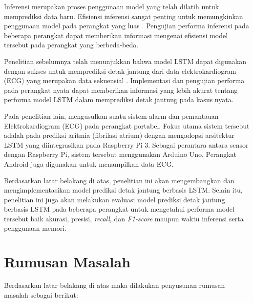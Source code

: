 Inferensi merupakan proses penggunaan model yang telah dilatih untuk memprediksi data baru. 
Efisiensi inferensi sangat penting untuk memungkinkan penggunaan model pada perangkat yang luas \parencite{ulkerReviewingInferencePerformance2020}. 
Pengujian performa inferensi pada beberapa perangkat dapat memberikan informasi mengenai efisiensi model tersebut pada perangkat yang berbeda-beda.

Penelitian sebelumnya telah menunjukkan bahwa model LSTM dapat digunakan dengan sukses untuk memprediksi detak jantung dari data elektrokardiogram (ECG) yang merupakan data sekuensial \parencite{shchetininArrhythmiaDetectionUsing2022}. Implementasi dan pengujian performa pada perangkat nyata dapat memberikan informasi yang lebih akurat tentang performa model LSTM dalam memprediksi detak jantung pada kasus nyata.

Pada penelitian lain, \textcite{ahsanuzzamanLowCostPortable2020} mengusulkan suatu sistem alarm dan pemantauan Elektrokardiogram (ECG) pada perangkat portabel. Fokus utama sistem tersebut adalah pada prediksi aritmia (fibrilasi atrium) dengan mengadopsi arsitektur LSTM yang diintegrasikan pada Raspberry Pi 3. Sebagai perantara antara sensor dengan Raspberry Pi, sistem tersebut menggunakan Arduino Uno. Perangkat Android juga digunakan untuk menampilkan data ECG. 

Berdasarkan latar belakang di atas, penelitian ini akan mengembangkan dan mengimplementasikan model prediksi detak jantung berbasis LSTM.
Selain itu, penelitian ini juga akan melakukan evaluasi model prediksi detak jantung berbasis LSTM pada beberapa perangkat untuk mengetahui performa model tersebut baik
akurasi, presisi, \emph{recall}, dan \emph{F1-score} maupun waktu inferensi serta penggunaan memori.


\section{Rumusan Masalah}

Berdasarkan latar belakang di atas maka dilakukan penyusunan rumusan masalah sebagai berikut:

